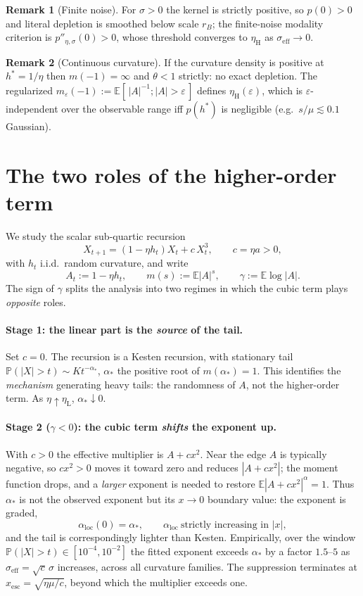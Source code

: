 \documentclass{article} %
\theoremstyle{plain}
\theoremstyle{definition}
\newtheorem{remark}{Remark}
\begin{document}
\begin{itemize}[nosep,leftmargin=*]
\begin{remark}[Finite noise]
For $\sigma>0$ the kernel is strictly positive, so $p(0)>0$ and literal
depletion is smoothed below scale $r_B$; the finite-noise modality
criterion is $p''_{\eta,\sigma}(0)>0$, whose threshold converges to
$\eta_{\mathrm H}$ as $\sigma_{\mathrm{eff}}\to0$.
\end{remark}

\begin{remark}[Continuous curvature]
If the curvature density is positive at $h^\ast=1/\eta$ then
$m(-1)=\infty$ and $\theta<1$ strictly: no exact depletion. The
regularized $m_\varepsilon(-1):=\mathbb{E}[\,|A|^{-1};|A|>\varepsilon\,]$
defines $\eta_{\mathrm H}(\varepsilon)$, which is
$\varepsilon$-independent over the observable range iff
$p(h^\ast)$ is negligible (e.g.\ $s/\mu\lesssim0.1$ Gaussian).
\end{remark}

\section*{The two roles of the higher-order term}

We study the scalar sub-quartic recursion
\[
X_{t+1}=(1-\eta h_t)X_t+c\,X_t^3,\qquad c=\eta a>0,
\]
with $h_t$ i.i.d.\ random curvature, and write
\[
A_t:=1-\eta h_t,\qquad
m(s):=\mathbb E|A|^s,\qquad
\gamma:=\mathbb E\log|A| .
\]
The sign of $\gamma$ splits the analysis into two regimes in which the cubic
term plays \emph{opposite} roles.

\paragraph{Stage 1: the linear part is the \emph{source} of the tail.}
Set $c=0$. The recursion is a Kesten recursion, with stationary tail
$\mathbb P(|X|>t)\sim Kt^{-\alpha_*}$, $\alpha_*$ the positive root of
$m(\alpha_*)=1$. This identifies the \emph{mechanism} generating heavy tails:
the randomness of $A$, not the higher-order term. As $\eta\uparrow\eta_{\mathrm L}$,
$\alpha_*\downarrow0$.

\paragraph{Stage 2 ($\gamma<0$): the cubic term \emph{shifts} the exponent up.}
With $c>0$ the effective multiplier is $A+cx^2$. Near the edge $A$ is typically
negative, so $cx^2>0$ moves it toward zero and reduces
$|A+cx^2|$; the moment function drops, and a \emph{larger} exponent is needed
to restore $\mathbb E|A+cx^2|^{\alpha}=1$. Thus $\alpha_*$ is not the observed
exponent but its $x\to0$ boundary value: the exponent is graded,
\[
\alpha_{\mathrm{loc}}(0)=\alpha_*,\qquad
\alpha_{\mathrm{loc}}\ \text{strictly increasing in }|x| ,
\]
and the tail is correspondingly lighter than Kesten. Empirically, over the
window $\mathbb P(|X|>t)\in[10^{-4},10^{-2}]$ the fitted exponent exceeds
$\alpha_*$ by a factor $1.5$--$5$ as $\sigma_{\mathrm{eff}}=\sqrt c\,\sigma$
increases, across all curvature families. The suppression terminates at
$x_{\mathrm{esc}}=\sqrt{\eta\mu/c}$, beyond which the multiplier exceeds one.

\end{itemize}
\end{document}
